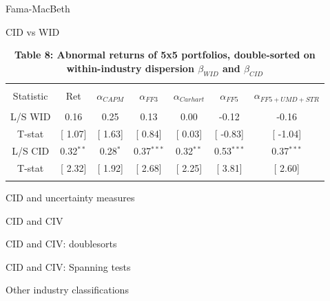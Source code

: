 \documentclass{beamer}
\begin{document}
\begin{frame}{Fama-MacBeth}
\end{frame}



\begin{frame}{CID vs WID}
\begin{table}[!htbp] \centering 
  \caption*{\textbf{Table 8: Abnormal returns of 5x5 portfolios, double-sorted on within-industry dispersion $\beta_{WID}$ and $\beta_{CID}$}} 
  \label{} 
\begin{tabular}{@{\extracolsep{5pt}} ccccccc} 
\\[-1.8ex]\hline 
\hline \\[-1.8ex] 
Statistic & Ret & $\alpha_{CAPM}$ & $\alpha_{FF3}$ & $\alpha_{Carhart}$ & $\alpha_{FF5}$ & $\alpha_{FF5+UMD+STR}$ \\ 
\hline \\[-1.8ex] 
L/S WID & 0.16 & 0.25 & 0.13 & 0.00 & -0.12 & -0.16 \\ 
T-stat & [ 1.07] & [ 1.63] & [ 0.84] & [ 0.03] & [ -0.83] & [ -1.04] \\ 
L/S CID & 0.32$^{**}$ & 0.28$^{*}$ & 0.37$^{***}$ & 0.32$^{**}$ & 0.53$^{***}$ & 0.37$^{***}$ \\ 
T-stat & [ 2.32] & [ 1.92] & [ 2.68] & [ 2.25] & [ 3.81] & [ 2.60] \\ 
\hline \\[-1.8ex] 
\end{tabular} 
\end{table}
\end{frame}



\begin{frame}{CID and uncertainty measures}
\end{frame}



\begin{frame}{CID and CIV}
\end{frame}



\begin{frame}{CID and CIV: doublesorts}
\end{frame}



\begin{frame}{CID and CIV: Spanning tests}
\end{frame}



\begin{frame}{Other industry classifications}
\end{frame}
\end{document}
